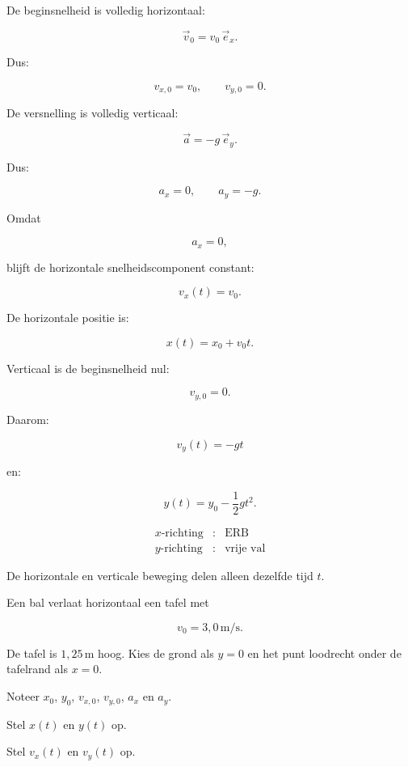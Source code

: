\documentclass{ximera}
\begin{document}
De beginsnelheid is volledig horizontaal:

\[
\vec v_0=v_0\,\vec e_x.
\]

Dus:

\[
v_{x,0}=v_0,
\qquad
v_{y,0}=0.
\]

De versnelling is volledig verticaal:

\[
\boxed{
\vec a=-g\,\vec e_y.
}
\]

Dus:

\[
a_x=0,
\qquad
a_y=-g.
\]



Omdat

\[
a_x=0,
\]

blijft de horizontale snelheidscomponent constant:

\[
\boxed{
v_x(t)=v_0.
}
\]

De horizontale positie is:

\[
\boxed{
x(t)=x_0+v_0t.
}
\]



Verticaal is de beginsnelheid nul:

\[
v_{y,0}=0.
\]

Daarom:

\[
\boxed{
v_y(t)=-gt
}
\]

en:

\[
\boxed{
y(t)=y_0-\frac12gt^2.
}
\]


\begin{eigenschap}

\[
\boxed{
\begin{array}{ccl}
x\text{-richting} &:& \text{ERB}\\[1mm]
y\text{-richting} &:& \text{vrije val}
\end{array}
}
\]

De horizontale en verticale beweging delen alleen dezelfde tijd $t$.

\end{eigenschap}


\begin{oefening}[De basisvergelijkingen]{\oefB\ESS}

Een bal verlaat horizontaal een tafel met

\[
v_0=3,0\,\mathrm{m/s}.
\]

De tafel is $1,25\,\mathrm{m}$ hoog. Kies de grond als $y=0$ en het
punt loodrecht onder de tafelrand als $x=0$.

\begin{question}
Noteer $x_0$, $y_0$, $v_{x,0}$, $v_{y,0}$, $a_x$ en $a_y$.
\end{question}

\begin{question}
Stel $x(t)$ en $y(t)$ op.
\end{question}

\begin{question}
Stel $v_x(t)$ en $v_y(t)$ op.
\end{question}

\end{oefening}
\end{document}
